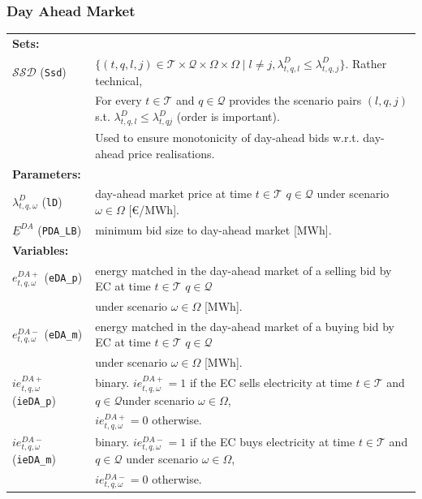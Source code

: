 \subsubsection{Day Ahead Market}

\begin{tabularx}{\textwidth}{l X}
\textbf{Sets:} \\
$\mathcal{SSD}$ (\texttt{Ssd}) & $\{(t, q, l, j) \in \mathcal{T} \times \mathcal{Q} \times \Omega \times \Omega \mid l \neq j, \lambda^D_{t, q, l} \leq \lambda^D_{t, q, j} \}$. Rather technical, \\
& For every $t \in \mathcal{T}$ and $q \in \mathcal{Q}$ provides the scenario pairs $(l, q, j)$ s.t. $\lambda^D_{t,q, l} \leq \lambda^D_{t,q j}$ (order is important). \\	
& Used to ensure monotonicity of day-ahead bids w.r.t. day-ahead price realisations. \\[1mm]

\textbf{Parameters:} \\
$\lambda^{D}_{t,q, \omega}$ (\texttt{lD}) & day-ahead market price at time $t \in \mathcal{T}$ $q \in \mathcal{Q}$ under scenario $\omega \in \Omega$ [\euro/MWh]. \\
$\underline{E}^{DA}$ (\texttt{PDA\_LB}) & minimum bid size to day-ahead market [MWh]. \\[1mm]

\textbf{Variables:} \\
$e^{DA+}_{t,q, \omega}$ (\texttt{eDA\_p}) & energy matched in the day-ahead market of a selling bid by EC at time $t \in \mathcal{T}$ $q \in \mathcal{Q}$ \\
& under scenario $\omega \in \Omega$ [MWh]. \\
$e^{DA-}_{t,q, \omega}$ (\texttt{eDA\_m}) & energy matched in the day-ahead market of a buying bid by EC at time $t \in \mathcal{T}$ $q \in \mathcal{Q}$\\
& under scenario $\omega \in \Omega$ [MWh]. \\
$ie^{DA+}_{t,q, \omega}$ (\texttt{ieDA\_p}) & binary. $ie^{DA+}_{t, q,\omega} = 1$ if the EC sells electricity at time $t \in \mathcal{T}$ and $q \in \mathcal{Q}$under scenario $\omega \in \Omega$, \\
& $ie^{DA+}_{t,q, \omega} = 0$ otherwise. \\
$ie^{DA-}_{t,q, \omega}$ (\texttt{ieDA\_m}) & binary. $ie^{DA-}_{t,q, \omega} = 1$ if the EC buys electricity at time $t \in \mathcal{T}$ and $q \in \mathcal{Q}$ under scenario $\omega \in \Omega$, \\
& $ie^{DA-}_{t,q,\omega} = 0$ otherwise. \\
\end{tabularx}

